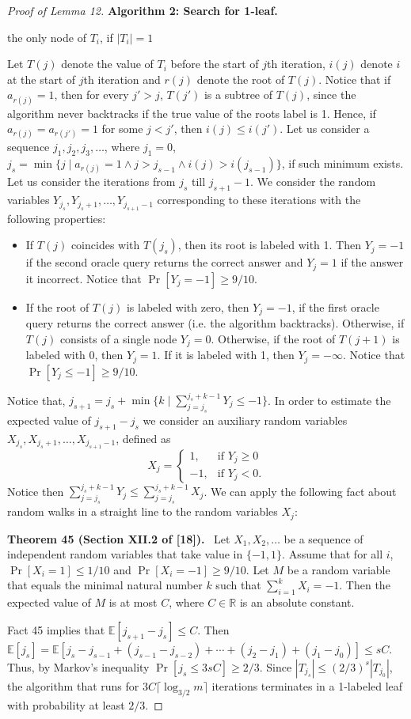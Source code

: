 \documentclass[10pt,a4paper]{article}
\newenvironment{authorclaim}[1]{\par\medskip\noindent\textbf{#1.}\ \ignorespaces}{\par\medskip}
\begin{document}
\begin{proof}[Proof of Lemma 12]
\begin{authorclaim}{Algorithm 2: Search for 1-leaf}
\begin{algorithmic}
\State \Return the only node of $T_i$, if $|T_i|=1$
\end{algorithmic}
\end{authorclaim}
Let $T(j)$ denote the value of $T_i$ before the start of $j$th iteration, $i(j)$ denote $i$ at the start of $j$th iteration and $r(j)$ denote the root of $T(j)$. Notice that if $a_{r(j)}=1$, then for every $j'>j$, $T(j')$ is a subtree of $T(j)$, since the algorithm never backtracks if the true value of the roots label is 1. Hence, if $a_{r(j)}=a_{r(j')}=1$ for some $j<j'$, then $i(j)\le i(j')$.
Let us consider a sequence $j_1,j_2,j_3,\ldots$, where $j_1=0$, $j_s=\min\{j\mid a_{r(j)}=1\wedge j>j_{s-1}\wedge i(j)>i(j_{s-1})\}$, if such minimum exists.
Let us consider the iterations from $j_s$ till $j_{s+1}-1$. We consider the random variables $Y_{j_s},Y_{j_s+1},\ldots,Y_{j_{s+1}-1}$ corresponding to these iterations with the following properties:
\begin{itemize}
\item If $T(j)$ coincides with $T(j_s)$, then its root is labeled with 1. Then $Y_j=-1$ if the second oracle query returns the correct answer and $Y_j=1$ if the answer it incorrect. Notice that $\Pr[Y_j=-1]\ge9/10$.
\item If the root of $T(j)$ is labeled with zero, then $Y_j=-1$, if the first oracle query returns the correct answer (i.e. the algorithm backtracks). Otherwise, if $T(j)$ consists of a single node $Y_j=0$. Otherwise, if the root of $T(j+1)$ is labeled with 0, then $Y_j=1$. If it is labeled with 1, then $Y_j=-\infty$. Notice that $\Pr[Y_j\le-1]\ge9/10$.
\end{itemize}
Notice that, $j_{s+1}=j_s+\min\{k\mid\sum_{j=j_s}^{j_s+k-1}Y_j\le-1\}$. In order to estimate the expected value of $j_{s+1}-j_s$ we consider an auxiliary random variables $X_{j_s},X_{j_s+1},\ldots,X_{j_{s+1}-1}$, defined as
\[
X_j=\begin{cases}1,&\text{if }Y_j\ge0\\-1,&\text{if }Y_j<0.\end{cases}
\]
Notice then $\sum_{j=j_s}^{j_s+k-1}Y_j\le\sum_{j=j_s}^{j_s+k-1}X_j$. We can apply the following fact about random walks in a straight line to the random variables $X_j$:
\begin{authorclaim}{Theorem 45 (Section XII.2 of [18])}
Let $X_1,X_2,\ldots$ be a sequence of independent random variables that take value in $\{-1,1\}$. Assume that for all $i$, $\Pr[X_i=1]\le1/10$ and $\Pr[X_i=-1]\ge9/10$. Let $M$ be a random variable that equals the minimal natural number $k$ such that $\sum_{i=1}^kX_i=-1$. Then the expected value of $M$ is at most $C$, where $C\in\mathbb R$ is an absolute constant.
\end{authorclaim}
Fact 45 implies that $\mathbb E[j_{s+1}-j_s]\le C$. Then $\mathbb E[j_s]=\mathbb E[j_s-j_{s-1}+(j_{s-1}-j_{s-2})+\cdots+(j_2-j_1)+(j_1-j_0)]\le sC$. Thus, by Markov's inequality $\Pr[j_s\le3sC]\ge2/3$. Since $|T_{j_s}|\le(2/3)^s|T_{j_0}|$, the algorithm that runs for $3C\lceil\log_{3/2}m\rceil$ iterations terminates in a 1-labeled leaf with probability at least $2/3$.
\end{proof}
\end{document}
